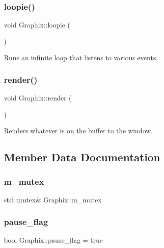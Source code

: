 \subsubsection{\texorpdfstring{loopie()}{loopie()}}
{\footnotesize\ttfamily void Graphix\+::loopie (\begin{DoxyParamCaption}{ }\end{DoxyParamCaption})}

Runs an infinite loop that listens to various events. \mbox{\label{class_graphix_a3e24075d5ded3741a9c14a7978b721d8}} 
\subsubsection{\texorpdfstring{render()}{render()}}
{\footnotesize\ttfamily void Graphix\+::render (\begin{DoxyParamCaption}{ }\end{DoxyParamCaption})}

Renders whatever is on the buffer to the window. 

\subsection{Member Data Documentation}
\mbox{\label{class_graphix_ab2136667d30ca5f0017bceded579a803}} 
\subsubsection{\texorpdfstring{m\_mutex}{m\_mutex}}
{\footnotesize\ttfamily std\+::mutex\& Graphix\+::m\+\_\+mutex}

\mbox{\label{class_graphix_ab883fc83301f2a1a9d55b7ed8828bf66}} 
\subsubsection{\texorpdfstring{pause\_flag}{pause\_flag}}
{\footnotesize\ttfamily bool Graphix\+::pause\+\_\+flag = true\hspace{0.3cm}{\ttfamily [static]}}

\mbox{\label{class_graphix_a8189df95428d2fda74b1becb84ed07c2}} 

